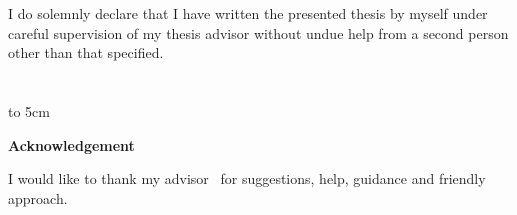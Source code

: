 \begin{centering}
  \begin{minipage}{0.72\textwidth}
  I do solemnly declare that I have written the presented thesis by myself
  under careful supervision of my thesis advisor without undue help from
  a second person other than that specified.
  \\ \\ \\
  \hfill\hbox to 5cm{\dotfill}
  \end{minipage}
\end{centering}

\newpage

\vspace*{7cm}
\begin{centering}
  {\textbf{Acknowledgement}}
\end{centering}
\bigskip\bigskip

I would like to thank my advisor \mfadvisor\ for suggestions, help, guidance and
friendly approach.
\vspace{1cm}
